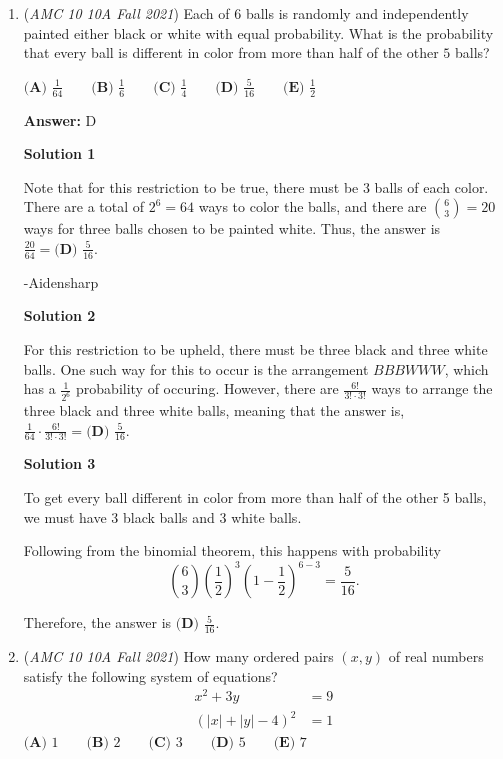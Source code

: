 \begin{enumerate}
 


	\item (\textit{AMC 10 10A Fall 2021}) Each of $6$ balls is randomly and independently painted either black or white with equal probability. What is the probability that every ball is different in color from more than half of the other $5$ balls?


 $\textbf{(A) } \frac{1}{64}\qquad\textbf{(B) } \frac{1}{6}\qquad\textbf{(C) } \frac{1}{4}\qquad\textbf{(D) } \frac{5}{16}\qquad\textbf{(E) }\frac{1}{2}$

 \textbf{Answer: }D



\textbf{Solution 1}

Note that for this restriction to be true, there must be $3$ balls of each color. There are a total of $2^6 = 64$ ways to color the balls, and there are ${6 \choose 3} = 20$ ways for three balls chosen to be painted white.  Thus, the answer is $\frac{20}{64} = \boxed{\textbf{(D) } \frac{5}{16}}$.

 -Aidensharp

 



\textbf{Solution 2}

For this restriction to be upheld, there must be three black and three white balls. One such way for this to occur is the arrangement $BBBWWW$, which has a $\frac{1}{2^6}$ probability of occuring. However, there are $\frac{6!}{3!\cdot{3!}}$ ways to arrange the three black and three white balls, meaning that the answer is, $\frac{1}{64}\cdot{\frac{6!}{3!\cdot{3!}}} = \boxed{\textbf{(D) } \frac{5}{16}}$.

 



\textbf{Solution 3}

To get every ball different in color from more than half of the other 5 balls, we must have 3 black balls and 3 white balls.

 Following from the binomial theorem, this happens with probability
 \[ \binom{6}{3} \left( \frac{1}{2} \right)^3 \left( 1 - \frac{1}{2} \right)^{6-3} = \frac{5}{16} . \]

 Therefore, the answer is $\boxed{\textbf{(D) }\frac{5}{16}}$.

 


	\item (\textit{AMC 10 10A Fall 2021}) How many ordered pairs $(x,y)$ of real numbers satisfy the following system of equations? 
\begin{align}
x^2+3y&=9 \\
(|x|+|y|-4)^2 &= 1
\end{align}
$\textbf{(A) } 1 \qquad\textbf{(B) } 2 \qquad\textbf{(C) } 3 \qquad\textbf{(D) } 5 \qquad\textbf{(E) } 7$


\end{enumerate}

